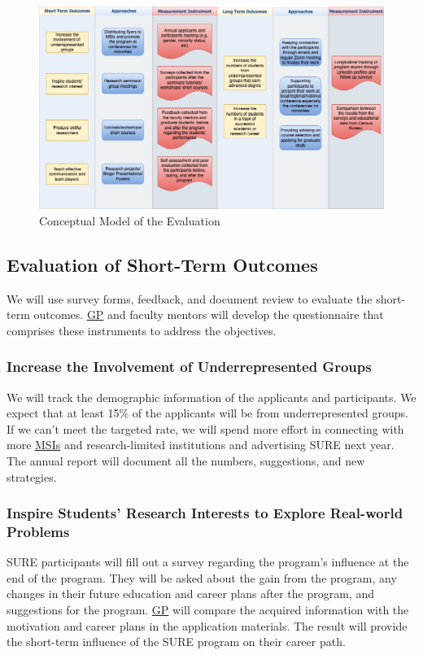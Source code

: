 \documentclass[11pt]{NSFamsart}
\newcommand{\GP}{\hyperlink{GPlink}{GP}\xspace}
\newcommand{\MSIs}{\hyperlink{MSIlink}{MSIs}\xspace}
\begin{document}
\begin{figure}[tbh]
    \centering
    \includegraphics[width = 16cm]{EvalModel.png}
    \caption{Conceptual Model of the Evaluation}
    \label{fig:my_label}
\end{figure}

\subsection{Evaluation of Short-Term Outcomes}

We will use survey forms, feedback, and document review to evaluate the short-term outcomes. 
\GP and faculty mentors will develop the questionnaire that comprises these instruments to address the objectives. 

\subsubsection{Increase the Involvement of Underrepresented Groups}
We will track the demographic information of the applicants and participants. We expect that at least 15\% of the applicants will be from underrepresented groups. If we can't meet the targeted rate, we will spend more effort in connecting with more \MSIs and research-limited institutions and advertising SURE next year.  The annual report will document all the numbers, suggestions, and new strategies. 

\subsubsection{
Inspire Students' Research Interests to Explore Real-world Problems}

SURE participants will fill out a survey regarding the program's influence at the end of the program. They will be asked about the gain from the program, any changes in their future education and career plans after the program, and suggestions for the program. \GP will compare the acquired information with the motivation and career plans in the application materials. The result will provide the short-term influence of the SURE program on their career path.
\end{document}
